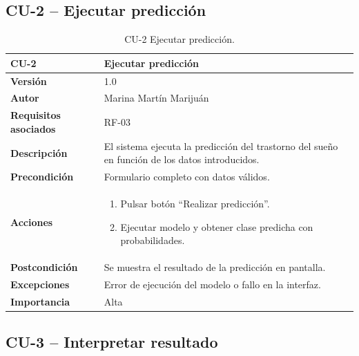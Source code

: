 \begin{samepage}
\subsection{CU-2 – Ejecutar predicción}

\begin{table}[!htbp]
	\centering
	\begin{tabularx}{\linewidth}{ p{} p{} }
		\toprule
		\textbf{CU-2}    & Ejecutar predicción \\
		\toprule
		\textbf{Versión}              & 1.0    \\
		\textbf{Autor}                & Marina Martín Marijuán \\
		\textbf{Requisitos asociados} & RF-03 \\
		\textbf{Descripción}          & El sistema ejecuta la predicción del trastorno del sueño en función de los datos introducidos. \\
		\textbf{Precondición}         & Formulario completo con datos válidos. \\
		\textbf{Acciones}             &
		\begin{enumerate}
			\item Pulsar botón “Realizar predicción”.
			\item Ejecutar modelo y obtener clase predicha con probabilidades.
		\end{enumerate}\\
		\textbf{Postcondición}        & Se muestra el resultado de la predicción en pantalla. \\
		\textbf{Excepciones}          & Error de ejecución del modelo o fallo en la interfaz. \\
		\textbf{Importancia}          & Alta \\
		\bottomrule
	\end{tabularx}
	\caption{CU-2 Ejecutar predicción.}
\end{table}
\end{samepage}

\subsection{CU-3 – Interpretar resultado}


